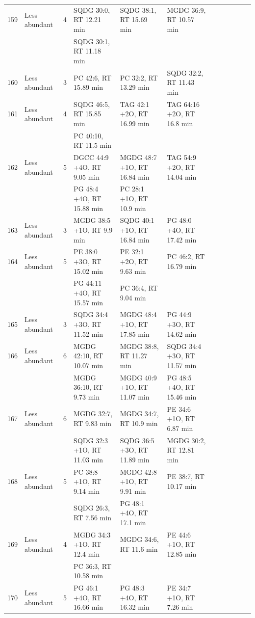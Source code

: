 \begin{landscape}
\begin{footnotesize}
\begin{singlespace}
\begin{flushleft}
\begin{longtable}{ Lp{.03\linewidth} Lp{.12\linewidth} Lp{.03\linewidth} Lp{.24\linewidth} Lp{.24\linewidth} Lp{.24\linewidth} }
159 & Less abundant & 4 & SQDG 30:0, RT 12.21 min & SQDG 38:1, RT 15.69 min & MGDG 36:9, RT 10.57 min \\
 &  &  & SQDG 30:1, RT 11.18 min &  &  \\
160 & Less abundant & 3 & PC 42:6, RT 15.89 min & PC 32:2, RT 13.29 min & SQDG 32:2, RT 11.43 min \\
161 & Less abundant & 4 & SQDG 46:5, RT 15.85 min & TAG 42:1 +2O, RT 16.99 min & TAG 64:16 +2O, RT 16.8 min \\
 &  &  & PC 40:10, RT 11.5 min &  &  \\
162 & Less abundant & 5 & DGCC 44:9 +4O, RT 9.05 min & MGDG 48:7 +1O, RT 16.84 min & TAG 54:9 +2O, RT 14.04 min \\
 &  &  & PG 48:4 +4O, RT 15.88 min & PC 28:1 +1O, RT 10.9 min &  \\
163 & Less abundant & 3 & MGDG 38:5 +1O, RT 9.9 min & SQDG 40:1 +1O, RT 16.84 min & PG 48:0 +4O, RT 17.42 min \\
164 & Less abundant & 5 & PE 38:0 +3O, RT 15.02 min & PE 32:1 +2O, RT 9.63 min & PC 46:2, RT 16.79 min \\
 &  &  & PG 44:11 +4O, RT 15.57 min & PC 36:4, RT 9.04 min &  \\
165 & Less abundant & 3 & SQDG 34:4 +3O, RT 11.52 min & MGDG 48:4 +1O, RT 17.85 min & PG 44:9 +3O, RT 14.62 min \\
166 & Less abundant & 6 & MGDG 42:10, RT 10.07 min & MGDG 38:8, RT 11.27 min & SQDG 34:4 +3O, RT 11.57 min \\
 &  &  & MGDG 36:10, RT 9.73 min & MGDG 40:9 +1O, RT 11.07 min & PG 48:5 +4O, RT 15.46 min \\
167 & Less abundant & 6 & MGDG 32:7, RT 9.83 min & MGDG 34:7, RT 10.9 min & PE 34:6 +1O, RT 6.87 min \\
 &  &  & SQDG 32:3 +1O, RT 11.03 min & SQDG 36:5 +3O, RT 11.89 min & MGDG 30:2, RT 12.81 min \\
168 & Less abundant & 5 & PC 38:8 +1O, RT 9.14 min & MGDG 42:8 +1O, RT 9.91 min & PE 38:7, RT 10.17 min \\
 &  &  & SQDG 26:3, RT 7.56 min & PG 48:1 +4O, RT 17.1 min &  \\
169 & Less abundant & 4 & MGDG 34:3 +1O, RT 12.4 min & MGDG 34:6, RT 11.6 min & PE 44:6 +1O, RT 12.85 min \\
 &  &  & PC 36:3, RT 10.58 min &  &  \\
170 & Less abundant & 5 & PG 46:1 +4O, RT 16.66 min & PG 48:3 +4O, RT 16.32 min & PE 34:7 +1O, RT 7.26 min \\

\end{longtable}
\end{flushleft}
\end{singlespace}
\end{footnotesize}
\end{landscape}
